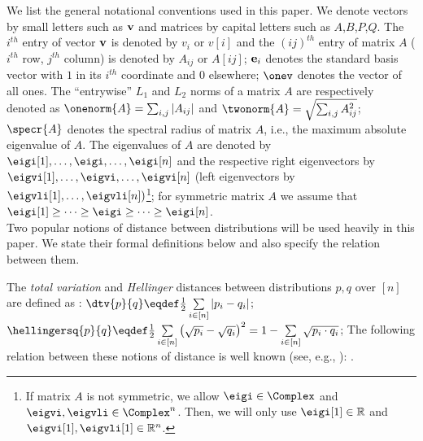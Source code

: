 We list the general notational conventions used in this paper. We denote vectors by small letters 
such as $\mathbf{v}$ and matrices by capital letters such as $A$,$B$,$P$,$Q$. The $i^{th}$ entry 
of vector $\mathbf{v}$ is denoted by $v_i$ or $v[i]$ and the $(ij)^{th}$ entry of matrix $A$ ($i^{th}$ row, $j^{th}$ column) is 
denoted by $A_{ij}$ or $A[ij]$; $\mathbf{e}_i$ denotes the standard basis vector with 
$1$ in its $i^{th}$ coordinate and $0$ elsewhere; $\onev$ denotes the vector of all ones. 
The ``entrywise'' $L_1$ and $L_2$ norms of a matrix  $A$ are respectively denoted as $\onenorm{A}=\sum_{i,j}|A_{ij}|$ and $\twonorm{A}=\sqrt{\sum_{i,j}A_{ij}^2}$; 
$\specr{A}$ denotes the spectral radius of matrix $A$, i.e., the maximum absolute eigenvalue of $A$. 
The eigenvalues of $A$ are denoted by $\eigi[1], \dots, \eigi, \dots, \eigi[n]$ and 
the respective right eigenvectors by $\eigvi[1],\dots,\eigvi,\dots,\eigvi[n]$ (left 
eigenvectors by $\eigvli[1],\dots,\eigvli[n])$\footnote{If matrix $A$ is not symmetric, we allow $\eigi\in\Complex$ and $\eigvi,\eigvli\in\Complex^n$. Then,
	we will only use $\eigi[1]\in\R$ and $\eigvi[1],\eigvli[1]\in\R^n$.}; for symmetric matrix $A$ we assume that 
$\eigi[1]\ge \dots \ge \eigi \ge \dots \ge \eigi[n]$.\\

\noindent Two popular notions of distance between distributions will be used heavily in this paper. We state their formal definitions below and also specify the relation between them.
\begin{definition}
	\label{def:stat_dist}
	The {\em total variation} and {\em Hellinger} distances between distributions $p,q$ over $[n]$ are defined as : 
	$\dtv{p}{q}\eqdef\frac{1}{2}\sum\limits_{i\in[n]}\abs{p_i-q_i}$;\quad\quad\quad\quad 
	$\hellingersq{p}{q}\eqdef\frac{1}{2}\sum\limits_{i\in[n]}\left(\sqrt{p_i}-\sqrt{q_i}\right)^2= 1-\sum\limits_{i\in[n]}\sqrt{p_i\cdot q_i}$;
	The following relation between these notions of distance is well known (see, e.g., \cite{GibbsS02}):
	\be
	\label{eq:tv hellinger relation}
	\cdot{}\ge{}\ge{}. 
	\ee
\end{definition}




